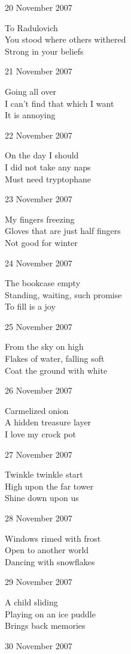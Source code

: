 \documentclass[12pt]{article}
\begin{document}
20 November 2007

To Radulovich \\
You stood where others withered \\
Strong in your beliefs

21 November 2007

Going all over \\
I can't find that which I want \\
It is annoying

22 November 2007

On the day I should \\
I did not take any naps \\
Must need tryptophane

23 November 2007

My fingers freezing \\
Gloves that are just half fingers \\
Not good for winter


\newpage


24 November 2007

The bookcase empty \\
Standing, waiting, such promise \\
To fill is a joy

25 November 2007

From the sky on high \\
Flakes of water, falling soft \\
Coat the ground with white

26 November 2007

Carmelized onion \\ 
A hidden treasure layer \\
I love my crock pot

27 November 2007

Twinkle twinkle start \\
High upon the far tower \\
Shine down upon us

28 November 2007

Windows rimed with frost \\
Open to another world  \\
Dancing with snowflakes

29 November 2007

A child sliding \\
Playing on an ice puddle \\
Brings back memories

30 November 2007
\end{document}
